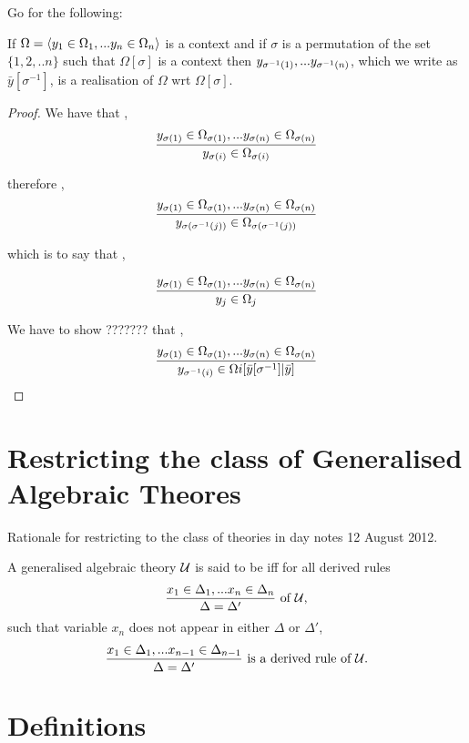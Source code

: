 \documentclass[10pt,a4paper]{scrartcl}
\begin{document}
Go for the following:
\begin{lemma}
If $\Omega = \encyOmega{n}$ is a context and if $\sigma$ is a permutation of the set $\{1,2,..n\}$ such that $\Omega[\sigma]$ is a context then
$\permterm{y}{n}{\sigma^{-1}}$, which we write as   $\bar{y}[\sigma^{-1}]$, is a realisation of $\Omega$ wrt $\Omega[\sigma]$.
\end{lemma}
\begin{proof}
We have that \foreachi,
\begin{equation*}
\frac{\yOmegasigma{n}}{\ofT{y_{\sigma(i)}}{\Omega_{\sigma(i)}}}
\end{equation*}

therefore \foreachj, 
\begin{equation*}
\frac
{\yOmegasigma{n}}     
        {\ofT
				    {y_{\sigma(\sigma^{-1}(j))}}
						{\Omega_{\sigma(\sigma^{-1}(j))}}
				}
\end{equation*}

which is to say that \foreachj, 

\begin{equation*}
\frac{\yOmegasigma{n}}{\ofT{y_j}{\Omega_{j}}}
\end{equation*}

We have to show ??????? that \foreachi, 
\begin{equation*}
\frac{\yOmegasigma{n}}{\ofT{y_{\sigma^{-1}(i)}}{\Omega{i}[ \bar{y}[\sigma^{-1}] | \bar{y}]}}
\end{equation*}
\end{proof}

\section{Restricting the class of Generalised Algebraic Theores}

Rationale for restricting to the class of theories in day notes 12 August 2012. 
\begin{definition}
A generalised algebraic theory $\gat$ is said to be 
iff for all derived rules 
$$
\frac{\con{x}{\Delta}{n}}{\Delta=\Delta'} \mbox{ of $\gat$,}
$$
such that variable $x_n$  does not appear in either
$\Delta$ or $\Delta'$,
$$
\frac{\con{x}{\Delta}{n-1}}{\Delta=\Delta'} \mbox{ is a derived rule of $\gat$.}
$$
\end{definition}
\section{Definitions}
\end{document}
